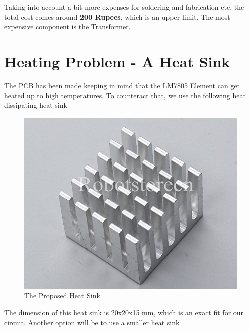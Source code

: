 \documentclass{article}
\begin{document}
Taking into account a bit more expenses for soldering and fabrication etc, the total cost comes around \textbf{200 Rupees}, which is an upper limit. The most expensive component is the Transformer.

\newpage

\section{Heating Problem - A Heat Sink}
The PCB has been made keeping in mind that the LM7805 Element can get heated up to high temperatures. To counteract that, we use the following heat dissipating heat sink

\begin{figure}[h!]
\centerline{\includegraphics[scale=.3]{Images/51y0tmVtm2L.jpg}}
\caption{The Proposed Heat Sink}
\label{figb}
\end{figure}

The dimension of this heat sink is 20x20x15 mm\cite{noauthor_heat_nodate}, which is an exact fit for our circuit. Another option will be to use a smaller heat sink
\end{document}
